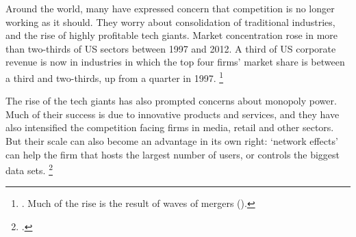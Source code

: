 Around the world, many have expressed concern that competition is no longer working as it should. They worry about consolidation of traditional industries, and the rise of highly profitable tech giants. Market concentration rose in more than two-thirds of US sectors between 1997 and 2012. %
A third of US corporate revenue is now in industries in which the top four firms' market share is between a third and two-thirds, up from a quarter in 1997.%
   \footnote{\textcite{Econtoohigh2016}. Much of the rise is the result of waves of mergers (\textcite[][9]{grullon2016us}).}


The rise of the tech giants has also prompted concerns about monopoly power. Much of their success is due to innovative products and services, and they have also intensified the competition facing firms in media, retail and other sectors. But their scale can also become an advantage in its own right: `network effects' can help the firm that hosts the largest number of users, or controls the biggest data sets.%
    \footcites{EzrachiVirtual}{Econsuperstar2016}{FT_Silicon_2016}{FT_GoogleEU_2016}


